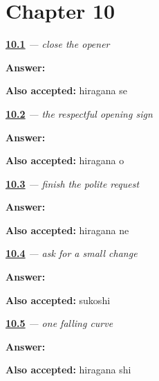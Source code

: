 \section*{Chapter 10}

\noindent\begin{minipage}[t]{\linewidth}
\raggedright
\hyperlink{review-JA-W10-se-write}{\textbf{10.1}} \emph{ — close the opener}\par
\small \textbf{Answer:} \par
\footnotesize \textbf{Also accepted:} hiragana se
\end{minipage}\par\medskip

\noindent\begin{minipage}[t]{\linewidth}
\raggedright
\hyperlink{review-JA-W10-o-first}{\textbf{10.2}} \emph{ — the respectful opening sign}\par
\small \textbf{Answer:} \par
\footnotesize \textbf{Also accepted:} hiragana o
\end{minipage}\par\medskip

\noindent\begin{minipage}[t]{\linewidth}
\raggedright
\hyperlink{review-JA-W10-ne-write}{\textbf{10.3}} \emph{ — finish the polite request}\par
\small \textbf{Answer:} \par
\footnotesize \textbf{Also accepted:} hiragana ne
\end{minipage}\par\medskip

\noindent\begin{minipage}[t]{\linewidth}
\raggedright
\hyperlink{review-JA-C10-sukoshi-meaning}{\textbf{10.4}} \emph{ — ask for a small change}\par
\small \textbf{Answer:} \par
\footnotesize \textbf{Also accepted:} sukoshi
\end{minipage}\par\medskip

\noindent\begin{minipage}[t]{\linewidth}
\raggedright
\hyperlink{review-JA-W10-shi-write}{\textbf{10.5}} \emph{ — one falling curve}\par
\small \textbf{Answer:} \par
\footnotesize \textbf{Also accepted:} hiragana shi
\end{minipage}\par\medskip

